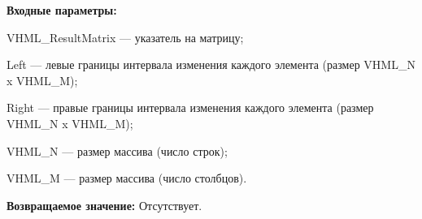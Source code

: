 \textbf{Входные параметры:}

 VHML\_ResultMatrix --- указатель на матрицу;
 
Left --- левые границы интервала изменения каждого элемента (размер VHML\_N x VHML\_M);

 Right --- правые границы интервала изменения каждого элемента (размер VHML\_N x VHML\_M);
 
 VHML\_N --- размер массива (число строк);
 
 VHML\_M --- размер массива (число столбцов).

\textbf{Возвращаемое значение:}
Отсутствует.